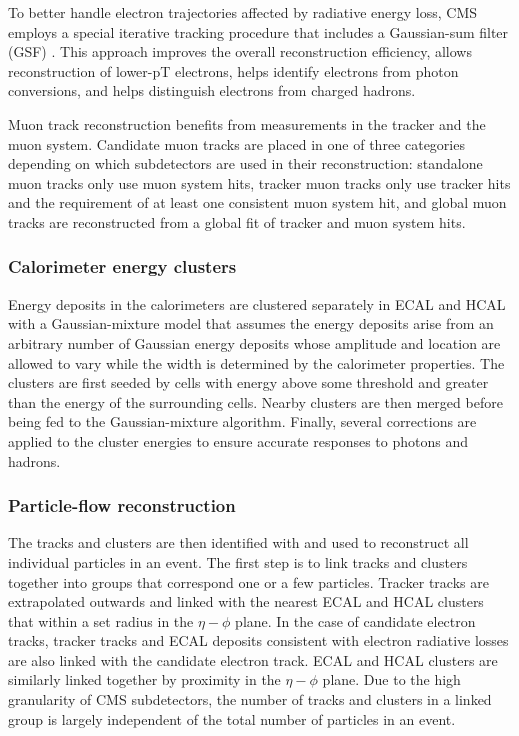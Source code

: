 To better handle electron trajectories affected by radiative energy loss, CMS employs a special iterative tracking procedure that includes a Gaussian-sum filter (GSF) \cite{gsf}. This approach improves the overall reconstruction efficiency, allows reconstruction of lower-pT electrons, helps identify electrons from photon conversions, and helps distinguish electrons from charged hadrons.

Muon track reconstruction benefits from measurements in the tracker and the muon system. Candidate muon tracks are placed in one of three categories depending on which subdetectors are used in their reconstruction: standalone muon tracks only use muon system hits, tracker muon tracks only use tracker hits and the requirement of at least one consistent muon system hit, and global muon tracks are reconstructed from a global fit of tracker and muon system hits.

\subsubsection{Calorimeter energy clusters}
Energy deposits in the calorimeters are clustered separately in ECAL and HCAL with a Gaussian-mixture model that assumes the energy deposits arise from an arbitrary number of Gaussian energy deposits whose amplitude and location are allowed to vary while the width is determined by the calorimeter properties. The clusters are first seeded by cells with energy above some threshold and greater than the energy of the surrounding cells. Nearby clusters are then merged before being fed to the Gaussian-mixture algorithm. Finally, several corrections are applied to the cluster energies to ensure accurate responses to photons and hadrons.

\subsubsection{Particle-flow reconstruction}
The tracks and clusters are then identified with and used to reconstruct all individual particles in an event. The first step is to link tracks and clusters together into groups that correspond one or a few particles. Tracker tracks are extrapolated outwards and linked with the nearest ECAL and HCAL clusters that within a set radius in the $\eta-\phi$ plane. In the case of candidate electron tracks, tracker tracks and ECAL deposits consistent with electron radiative losses are also linked with the candidate electron track. ECAL and HCAL clusters are similarly linked together by proximity in the $\eta-\phi$ plane. Due to the high granularity of CMS subdetectors, the number of tracks and clusters in a linked group is largely independent of the total number of particles in an event.

